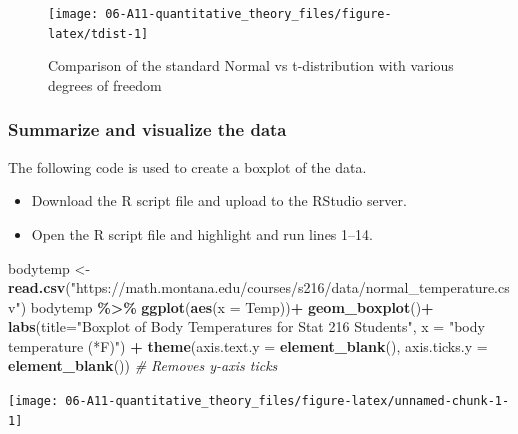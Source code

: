\documentclass[
]{report}
\newenvironment{Shaded}{\begin{snugshade}}{\end{snugshade}}
\newcommand{\AttributeTok}[1]{\textcolor[rgb]{0.13,0.29,0.53}{#1}}
\newcommand{\CommentTok}[1]{\textcolor[rgb]{0.56,0.35,0.01}{\textit{#1}}}
\newcommand{\FunctionTok}[1]{\textcolor[rgb]{0.13,0.29,0.53}{\textbf{#1}}}
\newcommand{\NormalTok}[1]{#1}
\newcommand{\OtherTok}[1]{\textcolor[rgb]{0.56,0.35,0.01}{#1}}
\newcommand{\SpecialCharTok}[1]{\textcolor[rgb]{0.81,0.36,0.00}{\textbf{#1}}}
\newcommand{\StringTok}[1]{\textcolor[rgb]{0.31,0.60,0.02}{#1}}
\begin{document}
\begin{figure}

{\centering \texttt{[image: 06-A11-quantitative\_theory\_files/figure-latex/tdist-1]} 

}

\caption{Comparison of the standard Normal vs t-distribution with various degrees of freedom}\label{fig:tdist}
\end{figure}

\subsubsection*{Summarize and visualize the data}\label{summarize-and-visualize-the-data-2}

The following code is used to create a boxplot of the data.

\begin{itemize}
\item
  Download the R script file and upload to the RStudio server.
\item
  Open the R script file and highlight and run lines 1--14.
\end{itemize}

\begin{Shaded}
\begin{Highlighting}[]
\NormalTok{bodytemp }\OtherTok{\textless{}{-}} \FunctionTok{read.csv}\NormalTok{(}\StringTok{"https://math.montana.edu/courses/s216/data/normal\_temperature.csv"}\NormalTok{)}
\NormalTok{bodytemp }\SpecialCharTok{\%\textgreater{}\%}
  \FunctionTok{ggplot}\NormalTok{(}\FunctionTok{aes}\NormalTok{(}\AttributeTok{x =}\NormalTok{ Temp))}\SpecialCharTok{+}
  \FunctionTok{geom\_boxplot}\NormalTok{()}\SpecialCharTok{+}
  \FunctionTok{labs}\NormalTok{(}\AttributeTok{title=}\StringTok{"Boxplot of Body Temperatures for Stat 216 Students"}\NormalTok{,}
       \AttributeTok{x =} \StringTok{"body temperature (*F)"}\NormalTok{) }\SpecialCharTok{+}
        \FunctionTok{theme}\NormalTok{(}\AttributeTok{axis.text.y =} \FunctionTok{element\_blank}\NormalTok{(), }
          \AttributeTok{axis.ticks.y =} \FunctionTok{element\_blank}\NormalTok{()) }\CommentTok{\# Removes y{-}axis ticks}
\end{Highlighting}
\end{Shaded}

\begin{center}\texttt{[image: 06-A11-quantitative\_theory\_files/figure-latex/unnamed-chunk-1-1]} \end{center}
\end{document}
